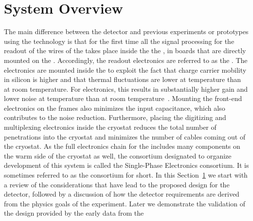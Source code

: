 \section{System Overview}
\label{sec:fdsp-tpcelec-overview}


The main difference between the   detector and 
previous experiments or prototypes using the  technology is
that for the first time all the signal processing for the readout of the
wires of the  takes place inside the the , in boards that 
are directly mounted on the . Accordingly, the  
readout electronics are referred to as the . The electronics are 
mounted inside the  to exploit the fact that charge carrier 
mobility in silicon is higher and that thermal fluctuations are lower 
at  temperature than at room temperature. For  
electronics, this results in substantially higher gain and lower noise 
at  temperature than at room temperature~\cite{DeGeronimo:2011zz}.
Mounting the front-end electronics on the  frames also minimizes 
the input capacitance, which also contributes to the noise reduction.  
Furthermore, placing the digitizing and multiplexing electronics inside 
the cryostat reduces the total number of penetrations into the cryostat 
and minimizes the number of cables coming out of the cryostat.  
As the full  electronics chain for the  includes 
many components on the warm side of the cryostat as well, the  
consortium designated to organize development of this system is called 
the  Single-Phase  Electronics consortium. 
It is sometimes referred to as the  consortium for short.
In this Section~\ref{sec:fdsp-tpcelec-overview} we start with a review of the considerations that
have lead to the proposed design for the   detector,
followed by a discussion of how the detector requirements are derived
from the physics goals of the experiment. Later we demonstrate the 
validation of the design provided by the early data from the 
